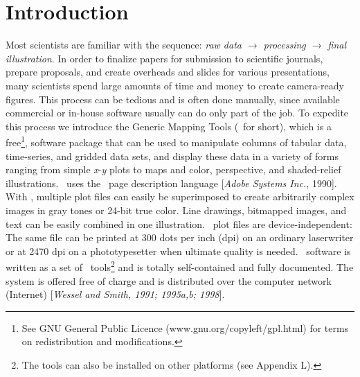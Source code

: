 %
%
\chapter{Introduction}
\thispagestyle{headings}

Most scientists are familiar with the sequence:
{\it raw data $\rightarrow$ processing $\rightarrow$ final illustration}.
In order to finalize papers for submission to scientific journals,
prepare proposals, and create overheads and slides for various
presentations, many scientists spend large amounts of time and
money to create camera-ready figures.  This process can be tedious
and is often done manually, since available commercial or in-house
software usually can do only part of the job.  To expedite this
process we introduce the Generic Mapping Tools (\GMT\ for short),
which is a free\footnote{See GNU General Public Licence
(www.gnu.org/copyleft/gpl.html) for terms on
redistribution and modifications.}, software package that can be used
to manipulate columns of tabular data, time-series, and gridded
data sets, and display these data in a variety of forms ranging
from simple {\it x}-{\it y} plots to maps and color, perspective,
and shaded-relief illustrations.  \GMT\ uses the \PS\
page description language [{\it Adobe Systems Inc.}, 1990].  With \PS, multiple plot
files can easily be superimposed to create arbitrarily complex
images in gray tones or 24-bit true color.  Line drawings, bitmapped
images, and text can be easily combined in one illustration.
\PS\ plot files are device-independent: The same file
can be printed at 300 dots per inch (dpi) on an ordinary laserwriter
or at 2470 dpi on a phototypesetter when ultimate quality is needed.
\GMT\ software is written as a set of \UNIX\ tools\footnote{The
tools can also be installed on other platforms (see Appendix L).}
and is totally self-contained and fully documented.  The system is offered free
of charge and is distributed over the computer
network (Internet) [{\it Wessel and Smith, 1991; 1995a,b; 1998}].

